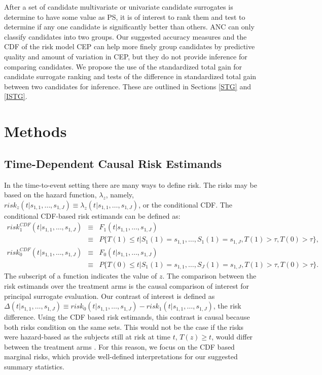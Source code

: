 \documentclass[times, doublespace]{simauth}
\begin{document}
After a set of candidate multivariate or univariate candidate surrogates is determine to have some value as PS, it is of interest to rank them and test to determine if any one candidate is significantly better than others. ANC can only classify candidates into two groups. Our suggested accuracy measures and the CDF of the risk model CEP can help more finely group candidates by predictive quality and amount of variation in CEP, but they do not provide inference for comparing candidates. We propose the use of the standardized total gain for candidate surrogate ranking and tests of the difference in standardized total gain between two candidates for inference. These are outlined in Sections \ref{STG} and \ref{ISTG}. 

\section{Methods}
\subsection{Time-Dependent Causal Risk Estimands} \label{CRE}
In the time-to-event setting there are many ways to define risk. The risks may be based on the hazard function, $\lambda_z$, namely, $risk_{z}(t|s_{1,1},\ldots,s_{1,J})\equiv\lambda_z(t|s_{1,1},\ldots,s_{1,J})$, or the conditional CDF. The conditional CDF-based risk estimands can be defined as:
\begin{eqnarray*}
risk_{1}^{CDF}(t|s_{1,1}, \ldots, s_{1,J}) &\equiv& F_1(t|s_{1,1}, \ldots, s_{1,J})\\
&\equiv& P\{T(1) \leq t|S_{1}(1)=s_{1,1},\ldots, S_{1}(1)=s_{1,J},T(1)> \tau, T(0)> \tau\},\\
risk_{0}^{CDF}(t|s_{1,1}, \ldots, s_{1,J}) &\equiv& F_0(t|s_{1,1}, \ldots, s_{1,J}) \\
&\equiv& P\{T(0) \leq t|S_{1}(1)=s_{1,1},\ldots, S_{J}(1)=s_{1,J},T(1)>\tau, T(0)>\tau\}.
\end{eqnarray*}
The subscript of a function indicates the value of $z$. The comparison between the risk estimands over the treatment arms is the causal comparison of interest for principal surrogate evaluation. Our contrast of interest is defined as $\Delta(t|s_{1,1}, \dots, s_{1,J}) \equiv risk_0(t|s_{1,1}, \ldots, s_{1,J})-risk_1(t|s_{1,1}, \ldots, s_{1,J})$, the risk difference. Using the CDF based risk estimands, this contrast is causal because both risks condition on the same sets. This would not be the case if the risks were hazard-based as the subjects still at risk at time $t$, $T(z)\geq t$, would differ between the treatment arms \citep{Hernan10, Gabriel13}. For this reason, we focus on the CDF based marginal risks, which provide well-defined  interpretations for our suggested summary statistics.
\end{document}
